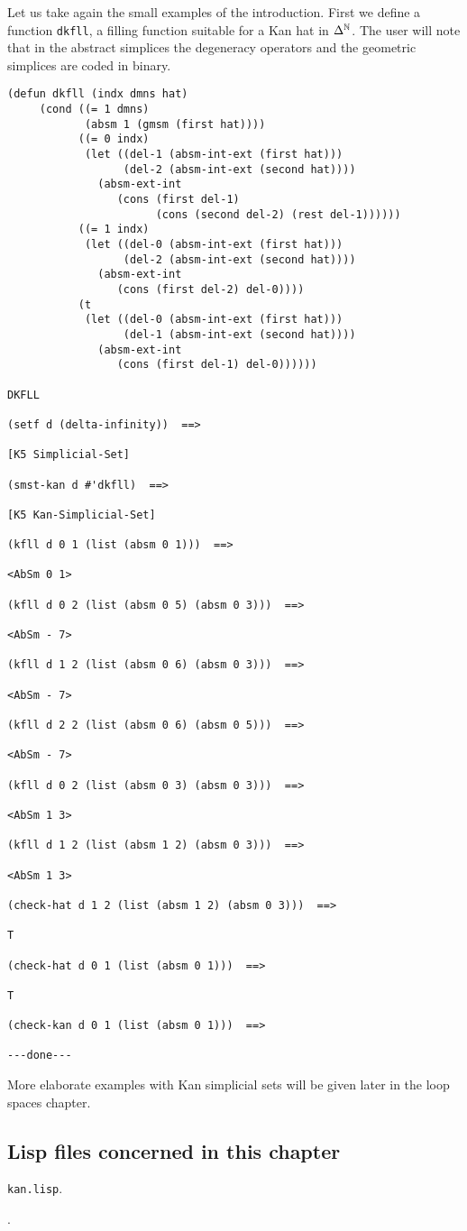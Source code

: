 Let us take again the small examples of the introduction. First we  define a function {\tt dkfll}, 
a filling function suitable for a  Kan hat in $\Delta^{{\Bbb N}}$. The user will note that
in the abstract simplices the degeneracy operators and the geometric simplices are coded in binary.
{\footnotesize\begin{verbatim}
(defun dkfll (indx dmns hat)
     (cond ((= 1 dmns)
            (absm 1 (gmsm (first hat))))
           ((= 0 indx)
            (let ((del-1 (absm-int-ext (first hat)))
                  (del-2 (absm-int-ext (second hat))))
              (absm-ext-int
                 (cons (first del-1)
                       (cons (second del-2) (rest del-1))))))
           ((= 1 indx)
            (let ((del-0 (absm-int-ext (first hat)))
                  (del-2 (absm-int-ext (second hat))))
              (absm-ext-int
                 (cons (first del-2) del-0))))
           (t
            (let ((del-0 (absm-int-ext (first hat)))
                  (del-1 (absm-int-ext (second hat))))
              (absm-ext-int
                 (cons (first del-1) del-0))))))

DKFLL

(setf d (delta-infinity))  ==>

[K5 Simplicial-Set]

(smst-kan d #'dkfll)  ==>

[K5 Kan-Simplicial-Set]

(kfll d 0 1 (list (absm 0 1)))  ==>

<AbSm 0 1>

(kfll d 0 2 (list (absm 0 5) (absm 0 3)))  ==>

<AbSm - 7>

(kfll d 1 2 (list (absm 0 6) (absm 0 3)))  ==>

<AbSm - 7>

(kfll d 2 2 (list (absm 0 6) (absm 0 5)))  ==>

<AbSm - 7>

(kfll d 0 2 (list (absm 0 3) (absm 0 3)))  ==>

<AbSm 1 3>

(kfll d 1 2 (list (absm 1 2) (absm 0 3)))  ==>

<AbSm 1 3>

(check-hat d 1 2 (list (absm 1 2) (absm 0 3)))  ==>

T

(check-hat d 0 1 (list (absm 0 1)))  ==>

T

(check-kan d 0 1 (list (absm 0 1)))  ==>

---done---
\end{verbatim}}

More elaborate examples with Kan simplicial sets will be given later in the
loop spaces chapter.

\subsection* {Lisp files concerned in this chapter}

{\tt kan.lisp}.
\par
[{\tt classes.lisp }, {\tt macros.lisp}, {\tt various.lisp}].
